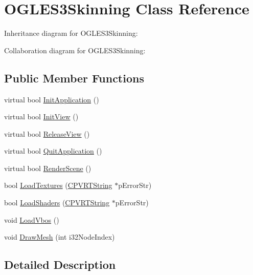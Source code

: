 \hypertarget{class_o_g_l_e_s3_skinning}{\section{O\+G\+L\+E\+S3\+Skinning Class Reference}
\label{class_o_g_l_e_s3_skinning}
}


Inheritance diagram for O\+G\+L\+E\+S3\+Skinning\+:


Collaboration diagram for O\+G\+L\+E\+S3\+Skinning\+:
\subsection*{Public Member Functions}
\begin{DoxyCompactItemize}
\item 
virtual bool \hyperlink{class_o_g_l_e_s3_skinning_a31b5f125cc84233687667b7aa9405369}{Init\+Application} ()
\item 
virtual bool \hyperlink{class_o_g_l_e_s3_skinning_abac6a9906b304b008e7e14ef30a8ab84}{Init\+View} ()
\item 
virtual bool \hyperlink{class_o_g_l_e_s3_skinning_a8621ed504cbec4e83c87ce0a0aa208df}{Release\+View} ()
\item 
virtual bool \hyperlink{class_o_g_l_e_s3_skinning_a0c40a8c0ffcf767d74b307f9c5522d2a}{Quit\+Application} ()
\item 
virtual bool \hyperlink{class_o_g_l_e_s3_skinning_a493b22c9b5ab107d183e4c087c3dc1ba}{Render\+Scene} ()
\item 
bool \hyperlink{class_o_g_l_e_s3_skinning_a567c064f6dc77c907b299931eebf1beb}{Load\+Textures} (\hyperlink{class_c_p_v_r_t_string}{C\+P\+V\+R\+T\+String} $\ast$p\+Error\+Str)
\item 
bool \hyperlink{class_o_g_l_e_s3_skinning_aec74b779fef30dadeb0fd5aac1182644}{Load\+Shaders} (\hyperlink{class_c_p_v_r_t_string}{C\+P\+V\+R\+T\+String} $\ast$p\+Error\+Str)
\item 
void \hyperlink{class_o_g_l_e_s3_skinning_a1cec4da58aacf3501b0798b781b3743a}{Load\+Vbos} ()
\item 
void \hyperlink{class_o_g_l_e_s3_skinning_afa9bc49e58d3b4a55eb7afae20bbe49e}{Draw\+Mesh} (int i32\+Node\+Index)
\end{DoxyCompactItemize}


\subsection{Detailed Description}


